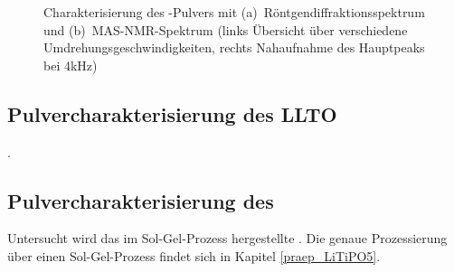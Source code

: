\documentclass[a4paper, 11pt, headsepline,footsepline,twoside,abstract]{scrbook}
\begin{document}
\begin{figure}
   \centering
       \vspace{6mm}
       \vspace{3mm}
	\caption{Charakterisierung des -Pulvers mit (a)~Röntgen\-diffraktionsspektrum und (b)~MAS-NMR-Spektrum (links Übersicht über verschiedene Umdrehungsgeschwindigkeiten, rechts Nahaufnahme des Hauptpeaks bei 4kHz)}
   	\label{pulver_LiTiPO5}
\end{figure}
\subsection{Pulvercharakterisierung des LLTO}
.
\subsection{Pulvercharakterisierung des }
Untersucht wird das im Sol-Gel-Prozess hergestellte . Die genaue Prozessierung über einen Sol-Gel-Prozess findet sich in Kapitel \ref{praep_LiTiPO5}.
\end{document}
